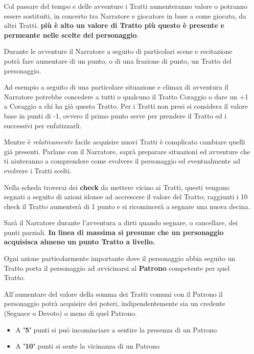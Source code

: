 \begin{multicols}{2}
Col passare del tempo e delle avventure i Tratti aumenteranno valore o potranno essere sostituiti, in concerto tra Narratore e giocatore in base a come giocato, da altri Tratti. \textbf{più è alto un valore di Tratto più questo è presente e permeante nelle scelte del personaggio}.

Durante le avventure il Narratore a seguito di particolari scene e recitazione potrà fare aumentare di un punto, o di una frazione di punto, un Tratto del personaggio.

Ad esempio a seguito di una particolare situazione e climax di avventura il Narratore potrebbe concedere a tutti o qualcuno il Tratto Coraggio o dare un +1 a Coraggio a chi ha già questo Tratto. Per i Tratti non presi si considera il valore base in punti di -1, ovvero il primo punto serve per prendere il Tratto ed i successivi per enfatizzarli.

Mentre è \emph{relativamente} facile acquisire nuovi Tratti è complicato cambiare quelli già presenti. Parlane con il Narratore, saprà preparare situazioni ed avventure che ti aiuteranno a comprendere come evolvere il personaggio ed eventualmente ad evolvere i Tratti scelti.

Nella scheda troverai dei \textbf{check} da mettere vicino ai Tratti, questi vengono segnati a seguito di azioni idonee ad accrescere il valore del Tratto; raggiunti i 10 check il Tratto aumenterà di 1 punto e si ricomincerà a segnare una nuova decina.

Sarà il Narratore durante l'avventura a dirti quando segnare, o cancellare, dei punti parziali. \textbf{In linea di massima si presume che un personaggio acquisisca almeno un punto Tratto a livello.}

Ogni azione particolarmente importante dove il personaggio abbia seguito un Tratto porta il personaggio ad avvicinarsi al \textbf{Patrono} competente per quel Tratto.

All'aumentare del valore della somma dei Tratti comuni con il Patrono il personaggio potrà acquisire dei poteri, indipendentemente sia un credente (Seguace o Devoto) o meno di quel Patrono.

\noindent\begin{itemize}[leftmargin=*] \setlength{\itemsep}{0pt}
\item A \textbf{'5'} punti si può incominciare a sentire la presenza di un Patrono

\item A \textbf{'10'} punti si sente la vicinanza di un Patrono


\end{itemize}
\end{multicols}

